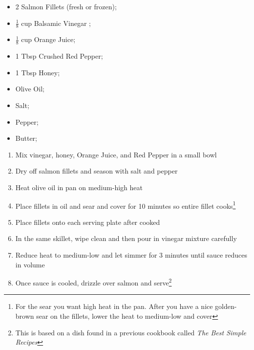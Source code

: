 \documentclass[oneside]{recipe}
\newcommand{\recipecolumn}[2]{
	\begin{multicols}{2}
	\raggedcolumns
	#1
	\columnbreak
	#2
	\end{multicols}
}
\begin{document}
\recipecolumn{
	\begin{itemize}
	\item 2 Salmon Fillets (fresh or frozen);
	\item $\frac{1}{8}$ cup Balsamic Vinegar ;
	\item $\frac{1}{8}$ cup Orange Juice;
	\item 1 Tbsp Crushed Red Pepper;
	\item 1 Tbsp Honey;
	\item Olive Oil;
  \item Salt;
	\item Pepper;
	\item Butter;
	\end{itemize}
}{
	\begin{enumerate}
		\item Mix vinegar, honey, Orange Juice, and Red Pepper in a small bowl
		\item Dry off salmon fillets and season with salt and pepper
		\item Heat olive oil in pan on medium-high heat
		\item Place fillets in oil and sear and cover for 10 minutes so entire fillet cooks\footnote{For the sear you want high heat in the pan. After you have a nice golden-brown sear on the fillets, lower the heat to medium-low and cover}
		\item Place fillets onto each serving plate after cooked
		\item In the same skillet, wipe clean and then pour in vinegar mixture carefully
		\item Reduce heat to medium-low and let simmer for 3 minutes until sauce reduces in volume
		\item Once sauce is cooled, drizzle over salmon and serve\footnote{This is based on a dish found in a previous cookbook called \textit{The Best Simple Recipes}}
	\end{enumerate}
}
\newpage
\end{document}
